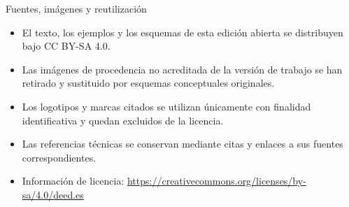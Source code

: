 \documentclass[aspectratio=169]{beamer}
\begin{document}
\begin{frame}{Fuentes, imágenes y reutilización}
\small
\begin{itemize}
  \item El texto, los ejemplos y los esquemas de esta edición abierta se distribuyen bajo CC BY-SA 4.0.
  \item Las imágenes de procedencia no acreditada de la versión de trabajo se han retirado y sustituido por esquemas conceptuales originales.
  \item Los logotipos y marcas citados se utilizan únicamente con finalidad identificativa y quedan excluidos de la licencia.
  \item Las referencias técnicas se conservan mediante citas y enlaces a sus fuentes correspondientes.
  \item Información de licencia: \url{https://creativecommons.org/licenses/by-sa/4.0/deed.es}
\end{itemize}
\end{frame}
\end{document}
